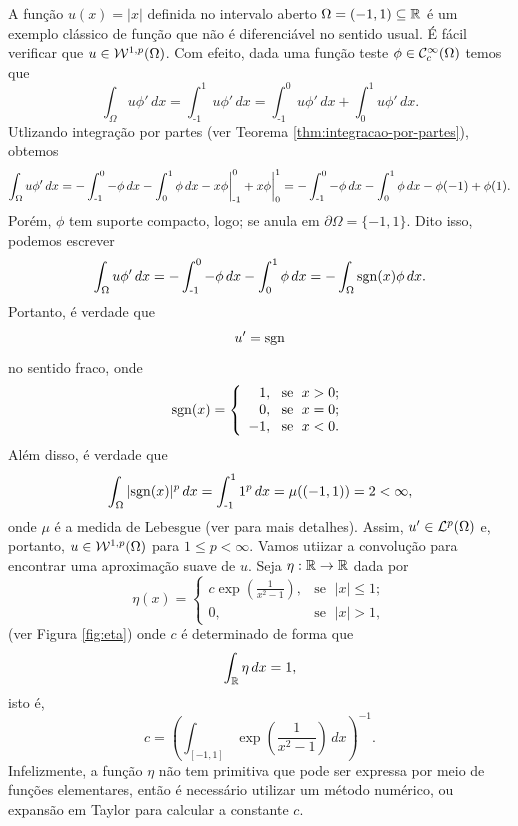 \begin{ex}
    A função $u(x) = |x|$ definida no intervalo aberto $\Omega = (-1,1) \subseteq \mathbb{R}$ é um exemplo clássico de função que não é diferenciável no sentido usual. É fácil verificar que $u \in \mathcal{W}^{1,p}(\Omega)$. Com efeito, dada uma função teste $\phi \in \mathcal{C}^\infty_c(\Omega)$ temos que
    \[
        \int_\Omega u \phi' \,dx = \int_{\text{-}1}^1 u \phi' \,dx = \int_{\text{-}1}^0 u \phi' \,dx + \int_0^1 u \phi' \,dx.
    \]
    Utlizando integração por partes (ver Teorema \ref{thm:integracao-por-partes}), obtemos
    \[
        \int_\Omega u \phi'\,dx =  - \int_{\text{-}1}^0 -\phi \,dx  - \int_0^1 \phi \,dx -x \phi \bigg|^{0}_{\text{-}1}+ x\phi \bigg|_0^1 = -\int_{\text{-}1}^{0} - \phi \,dx -\int_0^1 \phi \,dx - \phi(-1) + \phi(1).
    \]
    Porém, $\phi$ tem suporte compacto, logo; se anula em $\partial\Omega = \{-1,1\}$. Dito isso, podemos escrever
    \[
        \int_\Omega u \phi'\,dx = - \int_{\text{-}1}^0 -\phi \,dx - \int_0^1 \phi \,dx = -\int_\Omega \mathrm{sgn}(x)\phi \,dx.
    \]
    Portanto, é verdade que
    \[
        u'= \mathrm{sgn}
    \]
    no sentido fraco, onde
    \[
        \mathrm{sgn}(x) = 
        \left\{ 
            \begin{array}{rr}
                1, &\!\text{se }\; x > 0;\\
                0, &\!\text{se }\; x = 0;\\
                -1,&\!\text{se }\; x < 0.
            \end{array}
        \right.
    \]
    Além disso, é verdade que
    \[
        \int_\Omega |\mathrm{sgn}(x)|^p \,dx = \int_{\text{-}1}^1 1^p \,dx =  \mu((-1,1)) = 2 < \infty,
    \]
    onde $\mu$ é a medida de Lebesgue (ver \cite{axler-measure.theory} para mais detalhes). Assim, $u'\in \mathcal{L}^p(\Omega)$ e, portanto, $u \in \mathcal{W}^{1,p}(\Omega)$ para $1 \leqslant p < \infty$.
    Vamos utiizar a convolução para encontrar uma aproximação suave de $u$. 
    Seja $\eta : \mathbb{R} \to \mathbb{R}$ dada por
    \[
        \eta(x) = \left\{ 
            \begin{array}{lr}
                c \exp\left(\frac{1}{x^2 - 1} \right), & \text{se }\; |x| \leqslant 1;\\
                0, & \text{se }\; |x| > 1,
            \end{array}
        \right.
    \]
    (ver Figura \ref{fig:eta})
    onde $c$ é determinado de forma que
    \[
        \int_{\mathbb{R}} \eta \,dx = 1,
    \]
    isto é,
    \[
        c = \left( \int_{[-1,1]} \exp \left(\frac{1}{x^2 - 1} \right) \, dx\right)^{-1}.
    \]
    Infelizmente, a função $\eta$ não tem primitiva que pode ser expressa por meio de funções elementares, então é necessário utilizar um método numérico, ou expansão em Taylor para calcular a constante $c$.

\end{ex}
